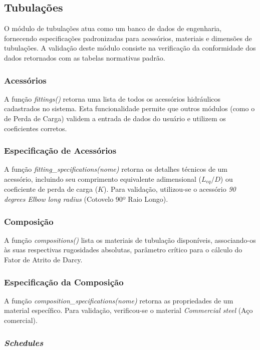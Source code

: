 \subsection{Tubulações}

O módulo de tubulações atua como um banco de dados de engenharia, fornecendo especificações padronizadas para acessórios, materiais e dimensões de tubulações. A validação deste módulo consiste na verificação da conformidade dos dados retornados com as tabelas normativas padrão.

\subsubsection{Acessórios}

A função \textit{fittings()} retorna uma lista de todos os acessórios hidráulicos cadastrados no sistema. Esta funcionalidade permite que outros módulos (como o de Perda de Carga) validem a entrada de dados do usuário e utilizem os coeficientes corretos.

\subsubsection{Especificação de Acessórios}

A função \textit{fitting\_specifications(nome)} retorna os detalhes técnicos de um acessório, incluindo seu comprimento equivalente adimensional ($L_{eq}/D$) ou coeficiente de perda de carga ($K$).
Para validação, utilizou-se o acessório \textit{90 degrees Elbow long radius} (Cotovelo 90º Raio Longo).

\subsubsection{Composição}

A função \textit{compositions()} lista os materiais de tubulação disponíveis, associando-os às suas respectivas rugosidades absolutas, parâmetro crítico para o cálculo do Fator de Atrito de Darcy.

\subsubsection{Especificação da Composição}

A função \textit{composition\_specifications(nome)} retorna as propriedades de um material específico.
Para validação, verificou-se o material \textit{Commercial steel} (Aço comercial).

\subsubsection{\textit{Schedules}}

